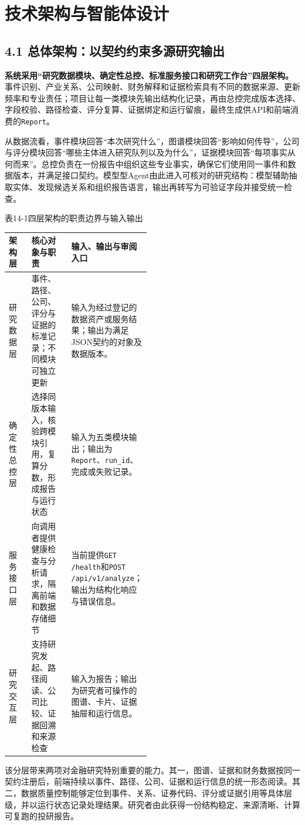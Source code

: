 \clearpage
\section{技术架构与智能体设计}
\subsection*{4.1 总体架构：以契约约束多源研究输出}\label{page:14}
\noindent\textbf{系统采用“研究数据模块、确定性总控、标准服务接口和研究工作台”四层架构。}事件识别、产业关系、公司映射、财务解释和证据检索具有不同的数据来源、更新频率和专业责任；项目让每一类模块先输出结构化记录，再由总控完成版本选择、字段校验、路径检查、评分复算、证据绑定和运行留痕，最终生成供API和前端消费的\texttt{Report}\cite{lhy-architecture,lhy-orchestrator}。

从数据流看，事件模块回答“本次研究什么”，图谱模块回答“影响如何传导”，公司与评分模块回答“哪些主体进入研究队列以及为什么”，证据模块回答“每项事实从何而来”。总控负责在一份报告中组织这些专业事实，确保它们使用同一事件和数据版本，并满足接口契约。模型型Agent由此进入可核对的研究结构：模型辅助抽取实体、发现候选关系和组织报告语言，输出再转写为可验证字段并接受统一检查。

\begin{center}\small 表14-1\quad 四层架构的职责边界与输入输出\par\vspace{1mm}
\begin{tabularx}{\linewidth}{p{0.17\linewidth}p{0.31\linewidth}X}
\toprule
架构层 & 核心对象与职责 & 输入、输出与审阅入口\\
\midrule
研究数据层 & 事件、路径、公司、评分与证据的标准记录；不同模块可独立更新 & 输入为经过登记的数据资产或服务结果；输出为满足JSON契约的对象及数据版本。\\
确定性总控层 & 选择同版本输入，核验跨模块引用，复算分数，形成报告与运行状态 & 输入为五类模块输出；输出为\texttt{Report}、\texttt{run\_id}、完成或失败记录。\\
服务接口层 & 向调用者提供健康检查与分析请求，隔离前端和数据存储细节 & 当前提供\texttt{GET /health}和\texttt{POST /api/v1/analyze}；输出为结构化响应与错误信息。\\
研究交互层 & 支持研究发起、路径阅读、公司比较、证据回溯和来源检查 & 输入为报告；输出为研究者可操作的图谱、卡片、证据抽屉和运行信息。\\
\bottomrule
\end{tabularx}\end{center}

该分层带来两项对金融研究特别重要的能力。其一，图谱、证据和财务数据按同一契约注册后，前端持续以事件、路径、公司、证据和运行信息的统一形态阅读。其二，数据质量控制能够定位到事件、关系、证券代码、评分或证据引用等具体层级，并以运行状态记录处理结果。研究者由此获得一份结构稳定、来源清晰、计算可复跑的投研报告。

